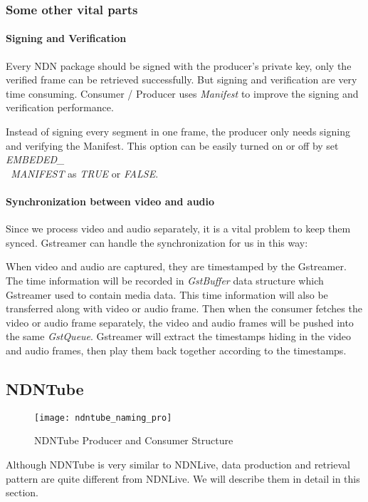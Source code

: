\subsubsection{Some other vital parts}
\paragraph{Signing and Verification} %
\label{par:signing_and_verification}
Every NDN package should be signed with the producer's private key, only the verified frame can be retrieved successfully. But signing and verification are very time consuming. Consumer / Producer uses \textit{Manifest} \cite{api-tr} to improve the signing and verification performance. 

Instead of signing every segment in one frame, the producer only needs signing and verifying the Manifest. This option can be easily turned on or off by set \textit{EMBEDED\_\\\ MANIFEST} as \textit{TRUE} or \textit{FALSE}.

\paragraph{Synchronization between video and audio}
\label{par:sync}
Since we process video and audio separately, it is a vital problem to keep them synced. Gstreamer can handle the synchronization for us in this way:

When video and audio are captured, they are timestamped by the Gstreamer. The time information will be recorded in \textit{GstBuffer} data structure which Gstreamer used to contain media data. This time information will also be transferred along with video or audio frame. Then when the consumer fetches the video or audio frame separately, the video and audio frames will be pushed into the same \textit{GstQueue}. Gstreamer will extract the timestamps hiding in the video and audio frames, then play them back together according to the timestamps.

\subsection{NDNTube}
\begin{figure*}[ht]
  \centering
  \texttt{[image: ndntube\_naming\_pro]}
  \caption{NDNTube Producer and Consumer Structure}
  \label{fig:ndntube_cp}
\end{figure*}
Although NDNTube is very similar to NDNLive, data production and retrieval pattern are quite different from NDNLive. We will describe them in detail in this section.

